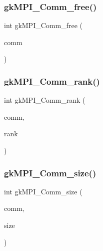 \mbox{\label{a00359_a2e7ef47df4a06a51305a9de602b41262}} 
\subsubsection{\texorpdfstring{gk\+M\+P\+I\+\_\+\+Comm\+\_\+free()}{gkMPI\_Comm\_free()}}
{\footnotesize\ttfamily int gk\+M\+P\+I\+\_\+\+Comm\+\_\+free (\begin{DoxyParamCaption}\item[{M\+P\+I\+\_\+\+Comm $\ast$}]{comm }\end{DoxyParamCaption})}

\mbox{\label{a00359_a3d476c06613e7a647941fcbeb002e5e6}} 
\subsubsection{\texorpdfstring{gk\+M\+P\+I\+\_\+\+Comm\+\_\+rank()}{gkMPI\_Comm\_rank()}}
{\footnotesize\ttfamily int gk\+M\+P\+I\+\_\+\+Comm\+\_\+rank (\begin{DoxyParamCaption}\item[{M\+P\+I\+\_\+\+Comm}]{comm,  }\item[{\hyperlink{a00876_aaa5262be3e700770163401acb0150f52}{idx\+\_\+t} $\ast$}]{rank }\end{DoxyParamCaption})}

\mbox{\label{a00359_aa6be69b686449a61266c75f859a7384a}} 
\subsubsection{\texorpdfstring{gk\+M\+P\+I\+\_\+\+Comm\+\_\+size()}{gkMPI\_Comm\_size()}}
{\footnotesize\ttfamily int gk\+M\+P\+I\+\_\+\+Comm\+\_\+size (\begin{DoxyParamCaption}\item[{M\+P\+I\+\_\+\+Comm}]{comm,  }\item[{\hyperlink{a00876_aaa5262be3e700770163401acb0150f52}{idx\+\_\+t} $\ast$}]{size }\end{DoxyParamCaption})}

